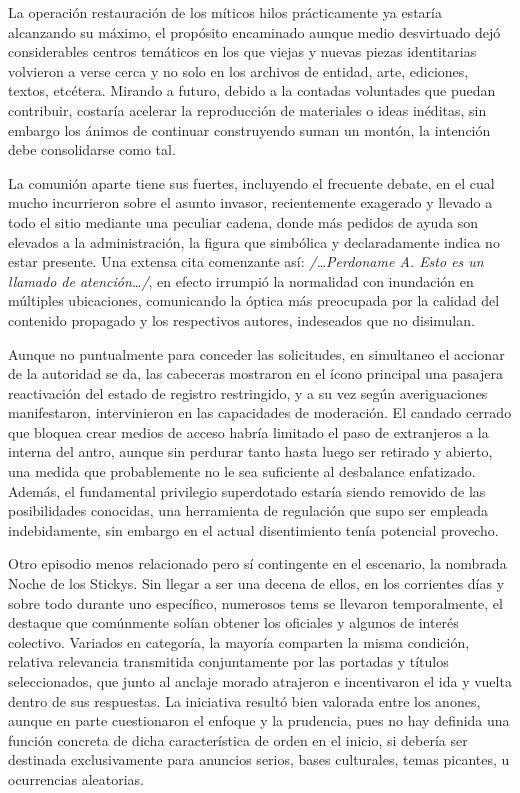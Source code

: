 \documentclass[
]{book}
\begin{document}
La operación restauración de los míticos hilos prácticamente ya estaría alcanzando su máximo, el propósito encaminado aunque medio desvirtuado dejó considerables centros temáticos en los que viejas y nuevas piezas identitarias volvieron a verse cerca y no solo en los archivos de entidad, arte, ediciones, textos, etcétera. Mirando a futuro, debido a la contadas voluntades que puedan contribuir, costaría acelerar la reproducción de materiales o ideas inéditas, sin embargo los ánimos de continuar construyendo suman un montón, la intención debe consolidarse como tal.

La comunión aparte tiene sus fuertes, incluyendo el frecuente debate, en el cual mucho incurrieron sobre el asunto invasor, recientemente exagerado y llevado a todo el sitio mediante una peculiar cadena, donde más pedidos de ayuda son elevados a la administración, la figura que simbólica y declaradamente indica no estar presente. Una extensa cita comenzante así: \emph{/\ldots Perdoname A. Esto es un llamado de atención\ldots/}, en efecto irrumpió la normalidad con inundación en múltiples ubicaciones, comunicando la óptica más preocupada por la calidad del contenido propagado y los respectivos autores, indeseados que no disimulan.

Aunque no puntualmente para conceder las solicitudes, en simultaneo el accionar de la autoridad se da, las cabeceras mostraron en el ícono principal una pasajera reactivación del estado de registro restringido, y a su vez según averiguaciones manifestaron, intervinieron en las capacidades de moderación. El candado cerrado que bloquea crear medios de acceso habría limitado el paso de extranjeros a la interna del antro, aunque sin perdurar tanto hasta luego ser retirado y abierto, una medida que probablemente no le sea suficiente al desbalance enfatizado. Además, el fundamental privilegio superdotado estaría siendo removido de las posibilidades conocidas, una herramienta de regulación que supo ser empleada indebidamente, sin embargo en el actual disentimiento tenía potencial provecho.

Otro episodio menos relacionado pero sí contingente en el escenario, la nombrada Noche de los Stickys. Sin llegar a ser una decena de ellos, en los corrientes días y sobre todo durante uno específico, numerosos tems se llevaron temporalmente, el destaque que comúnmente solían obtener los oficiales y algunos de interés colectivo. Variados en categoría, la mayoría comparten la misma condición, relativa relevancia transmitida conjuntamente por las portadas y títulos seleccionados, que junto al anclaje morado atrajeron e incentivaron el ida y vuelta dentro de sus respuestas. La iniciativa resultó bien valorada entre los anones, aunque en parte cuestionaron el enfoque y la prudencia, pues no hay definida una función concreta de dicha característica de orden en el inicio, si debería ser destinada exclusivamente para anuncios serios, bases culturales, temas picantes, u ocurrencias aleatorias.
\end{document}
